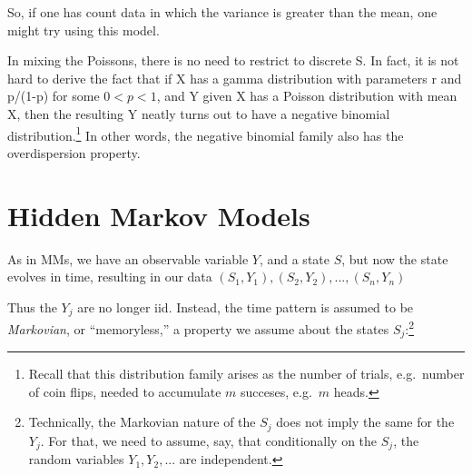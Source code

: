 \documentclass[11pt]{article}
\begin{document}
% 
% 
% 
% 
% 
% 
% 
% 
% 

So, if one has count data in which the variance is greater than the
mean, one might try using this model.

In mixing the Poissons, there is no need to restrict to discrete S.  In
fact, it is not hard to derive the fact that if X has a gamma
distribution with parameters r and p/(1-p) for some $0 < p < 1$, and Y
given X has a Poisson distribution with mean X, then the resulting Y
neatly turns out to have a negative binomial
distribution.\footnote{Recall that this distribution family arises as
the number of trials, e.g.\ number of coin flips, needed to accumulate
$m$ succeses, e.g.\ $m$ heads.}  In other words, the negative binomial
family also has the overdispersion property.

\section{Hidden Markov Models}

As in MMs, we have an observable variable $Y$, and a state $S$, but now
the state evolves in time, resulting in our data
$
(S_1,Y_1),
(S_2,Y_2),
...,
(S_n,Y_n)
$

Thus the $Y_j$ are no longer iid.  Instead, the time pattern is assumed
to be \textit{Markovian}, or ``memoryless,'' a property we assume about
the states $S_j$:\footnote{Technically, the Markovian nature of the
$S_j$ does not imply the same for the $Y_j$.  For that, we need to
assume, say, that conditionally on the $S_j$, the random variables $Y_1,
Y_2,...$ are independent.}
\end{document}
